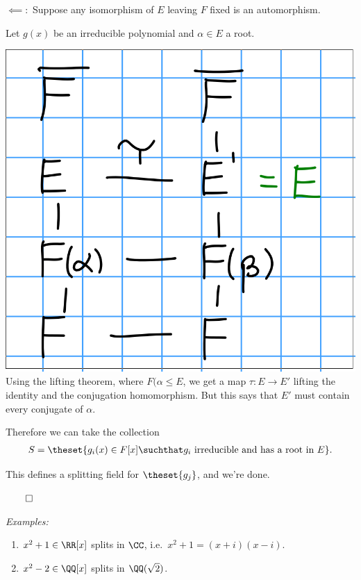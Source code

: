 \(\impliedby:\) Suppose any isomorphism of \(E\) leaving \(F\) fixed is
an automorphism.

Let \(g(x)\) be an irreducible polynomial and \(\alpha \in E\) a root.

\includegraphics{figures/2019-10-08-09:54.png}\\

Using the lifting theorem, where \(F(\alpha \leq E\), we get a map
\(\tau: E \to E'\) lifting the identity and the conjugation
homomorphism. But this says that \(E'\) must contain every conjugate of
\(\alpha\).

Therefore we can take the collection
\begin{align*}
S = \theset{g_i(x) \in F[x] \suchthat g_i \text{ irreducible and has a root in } E}
.\end{align*}

This defines a splitting field for \(\theset{g_j}\), and we're done.

\(\qed\)

\emph{Examples:}

\begin{enumerate}
\def\labelenumi{\arabic{enumi}.}
\tightlist
\item
  \(x^2 + 1 \in \RR[x]\) splits in \(\CC\),
  i.e.~\(x^2 + 1 = (x+i)(x-i)\).
\item
  \(x^2 - 2 \in \QQ[x]\) splits in \(\QQ(\sqrt 2)\).
\end{enumerate}

